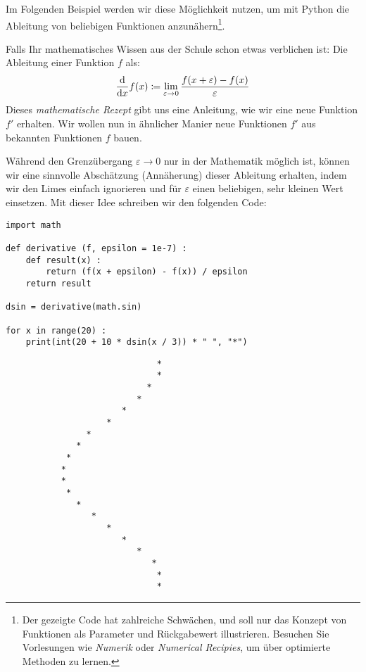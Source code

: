 Im Folgenden Beispiel werden wir diese Möglichkeit nutzen, um mit Python die Ableitung von beliebigen Funktionen anzunähern\footnote{Der gezeigte Code hat zahlreiche Schwächen, und soll nur das Konzept von Funktionen als Parameter und Rückgabewert illustrieren. Besuchen Sie Vorlesungen wie \emph{Numerik} oder \emph{Numerical Recipies}, um über optimierte Methoden zu lernen.}.

Falls Ihr mathematisches Wissen aus der Schule schon etwas verblichen ist: Die Ableitung einer Funktion $f$ als:
\begin{equation*}
	\dv{x}f(x) \coloneqq \lim_{\varepsilon \to 0} \frac{f(x + \varepsilon) - f(x)}{\varepsilon}
\end{equation*}
Dieses \emph{mathematische Rezept} gibt uns eine Anleitung, wie wir eine neue Funktion $f'$ erhalten. Wir wollen nun in ähnlicher Manier neue Funktionen $f'$ aus bekannten Funktionen $f$ bauen.

Während den Grenzübergang $\varepsilon \to 0$ nur in der Mathematik möglich ist, können wir eine sinnvolle Abschätzung (Annäherung) dieser Ableitung erhalten, indem wir den Limes einfach ignorieren und für $\varepsilon$ einen beliebigen, sehr kleinen Wert einsetzen. Mit dieser Idee schreiben wir den folgenden Code:

\begin{codebox}
\begin{verbatim}
import math

def derivative (f, epsilon = 1e-7) :
    def result(x) :
        return (f(x + epsilon) - f(x)) / epsilon
    return result

dsin = derivative(math.sin)

for x in range(20) :
    print(int(20 + 10 * dsin(x / 3)) * " ", "*")
\end{verbatim}
\end{codebox}
\begin{cmdbox}
\begin{verbatim}
                              *
                              *
                            *
                          *
                       *
                    *
                *
              *
            *
           *
           *
            *
              *
                 *
                    *
                       *
                          *
                             *
                              *
                              *
\end{verbatim}
\end{cmdbox}

